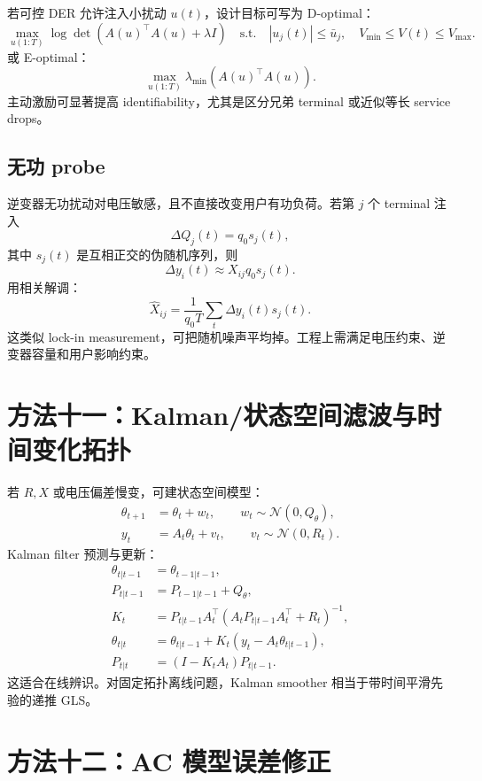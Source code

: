 \documentclass[UTF8,11pt]{ctexart}
\begin{document}
若可控 DER 允许注入小扰动 $u(t)$，设计目标可写为 D-optimal：
\[
    \max_{u(1:T)}
    \log\det(A(u)^\top A(u)+\lambda I)
    \quad
    \text{s.t.}\quad
    |u_j(t)|\le \bar u_j,\quad V_{\min}\le V(t)\le V_{\max}.
    \label{eq:d-optimal}
\]
或 E-optimal：
\[
    \max_{u(1:T)}
    \lambda_{\min}(A(u)^\top A(u)).
    \label{eq:e-optimal}
\]
主动激励可显著提高 identifiability，尤其是区分兄弟 terminal 或近似等长 service drops。

\subsection{无功 probe}

逆变器无功扰动对电压敏感，且不直接改变用户有功负荷。若第 $j$ 个 terminal 注入
\[
    \Delta Q_j(t)=q_0 s_j(t),
\]
其中 $s_j(t)$ 是互相正交的伪随机序列，则
\[
    \Delta y_i(t)\approx X_{ij}q_0s_j(t).
\]
用相关解调：
\[
    \widehat X_{ij}
    =
    \frac{1}{q_0T}\sum_t \Delta y_i(t)s_j(t).
    \label{eq:lockin}
\]
这类似 lock-in measurement，可把随机噪声平均掉。工程上需满足电压约束、逆变器容量和用户影响约束。

\section{方法十一：Kalman/状态空间滤波与时间变化拓扑}

若 $R,X$ 或电压偏差慢变，可建状态空间模型：
\begin{align}
    \theta_{t+1}&=\theta_t+w_t,\qquad w_t\sim\mathcal{N}(0,Q_\theta),\\
    y_t&=A_t\theta_t+v_t,\qquad v_t\sim\mathcal{N}(0,R_t).
\end{align}
Kalman filter 预测与更新：
\begin{align}
    \theta_{t|t-1}&=\theta_{t-1|t-1},\\
    P_{t|t-1}&=P_{t-1|t-1}+Q_\theta,\\
    K_t&=P_{t|t-1}A_t^\top(A_tP_{t|t-1}A_t^\top+R_t)^{-1},\\
    \theta_{t|t}&=\theta_{t|t-1}+K_t(y_t-A_t\theta_{t|t-1}),\\
    P_{t|t}&=(I-K_tA_t)P_{t|t-1}.
\end{align}
这适合在线辨识。对固定拓扑离线问题，Kalman smoother 相当于带时间平滑先验的递推 GLS。

\section{方法十二：AC 模型误差修正}
\end{document}
